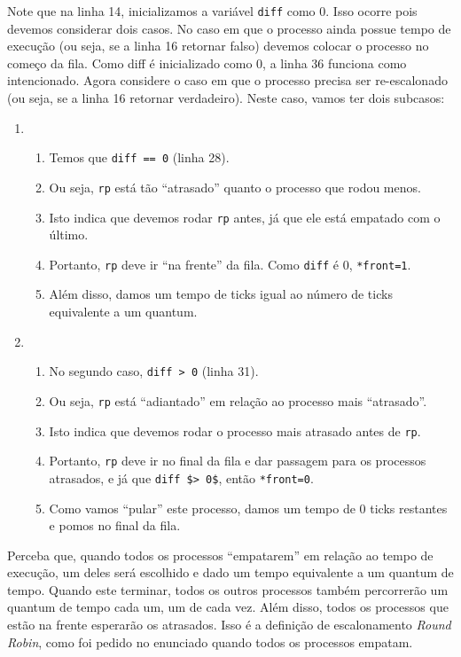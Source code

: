 \documentclass{amsart}
\theoremstyle{plain}
\newcommand{\code}[1]{\lstinline[mathescape=true]{#1}}
\newcommand{\mcode}[1]{\lstinline[mathescape]!#1!}
\begin{document}
Note que na linha 14, inicializamos a variável \code{diff} como 0. Isso ocorre pois devemos
considerar dois casos. No caso em que o processo ainda possue tempo de execução (ou seja, se a
linha 16 retornar falso) devemos colocar o processo no começo da fila. Como diff é inicializado
como 0, a linha 36 funciona como intencionado. Agora considere o caso em que o processo precisa ser
re-escalonado (ou seja, se a linha 16 retornar verdadeiro). Neste caso, vamos ter dois subcasos:

\begin{enumerate}[label*=\arabic*o.~subcaso]
  \item~\\
    \begin{enumerate}[label=1.\arabic*.]
      \item Temos que \code{diff == 0} (linha 28).
      \item Ou seja, \code{rp} está tão ``atrasado'' quanto o processo que rodou menos.
      \item Isto indica que devemos rodar \code{rp} antes, já que ele está empatado com o último.
      \item Portanto, \code{rp} deve ir ``na frente'' da fila. Como \code{diff} é 0, \code{*front=1}.
      \item Além disso, damos um tempo de ticks igual ao número de ticks equivalente a um quantum.
    \end{enumerate}
  \item~\\
  \begin{enumerate}[label=2.\arabic*.]
    \item No segundo caso, \code{diff > 0} (linha 31).
    \item Ou seja, \code{rp} está ``adiantado'' em relação ao processo mais ``atrasado''.
    \item Isto indica que devemos rodar o processo mais atrasado antes de \code{rp}.
    \item Portanto, \code{rp} deve ir no final da fila e dar passagem para os processos atrasados,
      e já que \mcode{diff $> 0$}, então \code{*front=0}.
    \item Como vamos ``pular'' este processo, damos um tempo de 0 ticks restantes e pomos no final
      da fila.
  \end{enumerate}
\end{enumerate}

Perceba que, quando todos os processos ``empatarem'' em relação ao tempo de execução, um deles será
escolhido e dado um tempo equivalente a um quantum de tempo. Quando este terminar, todos os outros
processos também percorrerão um quantum de tempo cada um, um de cada vez. Além disso, todos os
processos que estão na frente esperarão os atrasados. Isso é a definição de escalonamento
\textit{Round Robin}, como foi pedido no enunciado quando todos os processos empatam.
\end{document}

